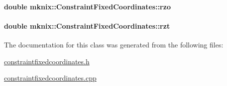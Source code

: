 \hypertarget{classmknix_1_1_constraint_fixed_coordinates_a1e43b5f72d8064762f0427204f46b3a1}{
\paragraph[{rzo}]{\setlength{\rightskip}{0pt plus 5cm}double mknix\-::\-Constraint\-Fixed\-Coordinates\-::rzo\hspace{0.3cm}{\ttfamily [protected]}}}\label{classmknix_1_1_constraint_fixed_coordinates_a1e43b5f72d8064762f0427204f46b3a1}
\hypertarget{classmknix_1_1_constraint_fixed_coordinates_a45657121be64f04cf1667a9090ba6451}{
\paragraph[{rzt}]{\setlength{\rightskip}{0pt plus 5cm}double mknix\-::\-Constraint\-Fixed\-Coordinates\-::rzt\hspace{0.3cm}{\ttfamily [protected]}}}\label{classmknix_1_1_constraint_fixed_coordinates_a45657121be64f04cf1667a9090ba6451}


The documentation for this class was generated from the following files\-:\begin{DoxyCompactItemize}
\item 
\hyperlink{constraintfixedcoordinates_8h}{constraintfixedcoordinates.\-h}\item 
\hyperlink{constraintfixedcoordinates_8cpp}{constraintfixedcoordinates.\-cpp}\end{DoxyCompactItemize}
